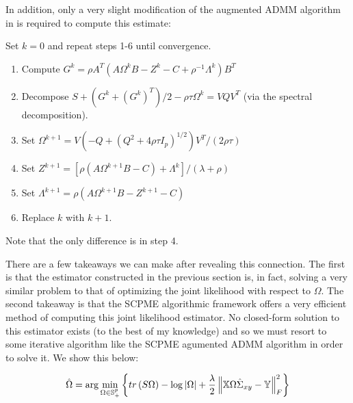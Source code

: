\documentclass[11pt,]{report}
\begin{document}
In addition, only a very slight modification of the augmented ADMM algorithm in \citet{molstad2017shrinking} is required to compute this estimate:

Set \(k = 0\) and repeat steps 1-6 until convergence.

\begin{enumerate}
\def\labelenumi{\arabic{enumi}.}
\item
  Compute \(G^{k} = \rho A^{T}\left( A\Omega^{k} B - Z^{k} - C + \rho^{-1}\Lambda^{k} \right)B^{T}\)
\item
  Decompose \(S + \left( G^{k} + (G^{k})^{T} \right)/2 - \rho\tau\Omega^{k} = VQV^{T}\) (via the spectral decomposition).
\item
  Set \(\Omega^{k + 1} = V\left( -Q + (Q^{2} + 4\rho\tau I_{p})^{1/2} \right)V^{T}/(2\rho\tau)\)
\item
  Set \(Z^{k + 1} = \left[ \rho\left( A\Omega^{k + 1} B - C \right) + \Lambda^{k} \right]/(\lambda + \rho)\)
\item
  Set \(\Lambda^{k + 1} = \rho\left( A\Omega^{k + 1} B - Z^{k + 1} - C \right)\)
\item
  Replace \(k\) with \(k + 1\).
\end{enumerate}

Note that the only difference is in step 4.

There are a few takeaways we can make after revealing this connection. The first is that the estimator constructed in the previous section is, in fact, solving a very similar problem to that of optimizing the joint likelihood with respect to \(\Omega\). The second takeaway is that the SCPME algorithmic framework offers a very efficient method of computing this joint likelihood estimator. No closed-form solution to this estimator exists (to the best of my knowledge) and so we must resort to some iterative algorithm like the SCPME agumented ADMM algorithm in order to solve it. We show this below:

\begin{equation}
\hat{\Omega} = \arg\min_{\Omega \in \mathbb{S}_{+}^{p}}\left\{ tr\left(S\Omega\right) - \log\left|\Omega\right| + \frac{\lambda}{2}\left\|\mathbb{X}\Omega\hat{\Sigma}_{xy} - \mathbb{Y}\right\|_{F}^{2} \right\}
\label{eq:penregression2}\notag
\end{equation}
\end{document}
